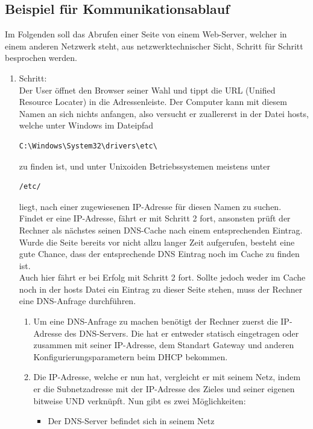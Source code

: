 \documentclass[12pt,a4paper]{report}
\begin{document}
\subsection{Beispiel für Kommunikationsablauf}
Im Folgenden soll das Abrufen einer Seite von einem Web-Server, welcher in einem anderen Netzwerk steht, aus netzwerktechnischer Sicht, Schritt für Schritt besprochen werden.\\
\begin{enumerate}
\item Schritt:\\
Der User öffnet den Browser seiner Wahl und tippt die URL (Unified Resource Locater) in die Adressenleiste. Der Computer kann mit diesem Namen an sich nichts anfangen, also versucht er zuallererst in der Datei \glqq hosts\grqq , welche unter Windows im Dateipfad
\begin{lstlisting} 
C:\Windows\System32\drivers\etc\ 
\end{lstlisting} zu finden ist, und unter Unixoiden Betriebssystemen meistens unter 
\begin{lstlisting} 
/etc/
\end{lstlisting} liegt, nach einer zugewiesenen IP-Adresse für diesen Namen zu suchen.\\
Findet er eine IP-Adresse, fährt er mit Schritt 2 fort, ansonsten prüft der Rechner als nächstes seinen DNS-Cache nach einem entsprechenden Eintrag. Wurde die Seite bereits vor nicht allzu langer Zeit aufgerufen, besteht eine gute Chance, dass der entsprechende DNS Eintrag noch im Cache zu finden ist.\\
Auch hier fährt er bei Erfolg mit Schritt 2 fort. Sollte jedoch weder im Cache noch in der hosts Datei ein Eintrag zu dieser Seite stehen, muss der Rechner eine DNS-Anfrage durchführen.\\
\begin{enumerate}
\item Um eine DNS-Anfrage zu machen benötigt der Rechner zuerst die IP-Adresse des DNS-Servers. Die hat er entweder statisch eingetragen oder zusammen mit seiner IP-Adresse, dem Standart Gateway und anderen Konfigurierungsparametern beim DHCP bekommen.
\item Die IP-Adresse, welche er nun hat, vergleicht er mit seinem Netz, indem er die Subnetzadresse mit der IP-Adresse des Zieles und seiner eigenen bitweise UND verknüpft. Nun gibt es zwei Möglichkeiten: 
\begin{itemize}
\item Der DNS-Server befindet sich in seinem Netz

\end{itemize}
\end{enumerate}
\end{enumerate}
\end{document}

